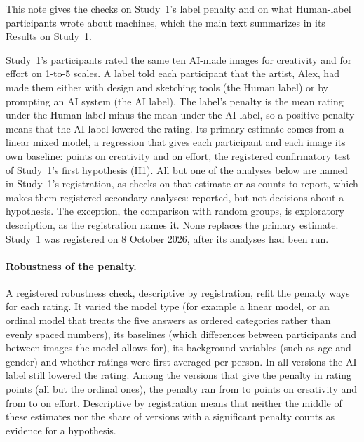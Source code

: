 
This note gives the checks on Study~1's label penalty and on what Human-label participants wrote about machines, which the main text summarizes in its Results on Study~1.

Study~1's \SOneN{} participants rated the same ten AI-made images for creativity and for effort on 1-to-5 scales. A label told each participant that the artist, Alex, had made them either with design and sketching tools (the Human label) or by prompting an AI system (the AI label). The label's penalty is the mean rating under the Human label minus the mean under the AI label, so a positive penalty means that the AI label lowered the rating. Its primary estimate comes from a linear mixed model, a regression that gives each participant and each image its own baseline: \SOneHOneCreatDiff{} points on creativity and \SOneHOneEffDiff{} on effort, the registered confirmatory test of Study~1's first hypothesis (H1). All but one of the analyses below are named in Study~1's registration, as checks on that estimate or as counts to report, which makes them registered secondary analyses: reported, but not decisions about a hypothesis. The exception, the comparison with random groups, is exploratory description, as the registration names it. None replaces the primary estimate. Study~1 was registered on 8 October 2026, after its analyses had been run.

\paragraph*{Robustness of the penalty.}
A registered robustness check, descriptive by registration, refit the penalty \SOneSpecN{} ways for each rating. It varied the model type (for example a linear model, or an ordinal model that treats the five answers as ordered categories rather than evenly spaced numbers), its baselines (which differences between participants and between images the model allows for), its background variables (such as age and gender) and whether ratings were first averaged per person. In all \SOneSpecNTotal{} versions the AI label still lowered the rating. Among the versions that give the penalty in rating points (all but the ordinal ones), the penalty ran from \SOneSpecCreatMin{} to \SOneSpecCreatMax{} points on creativity and from \SOneSpecEffMin{} to \SOneSpecEffMax{} on effort. Descriptive by registration means that neither the middle of these estimates nor the share of versions with a significant penalty counts as evidence for a hypothesis.

